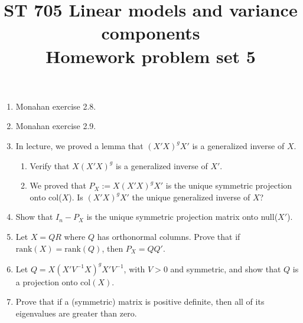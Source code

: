 \documentclass[11pt]{article}
\title{ST 705 Linear models and variance components \\ 
        Homework problem set 5}
\begin{document}
\maketitle

\begin{enumerate}

\item Monahan exercise 2.8.

\item Monahan exercise 2.9.

\item In lecture, we proved a lemma that $(X'X)^{g}X'$ is a generalized inverse of $X$.
\begin{enumerate}
\item Verify that $X(X'X)^{g}$ is a generalized inverse of $X'$.
\item We proved that $P_{X} := X(X'X)^{g}X'$ is the unique symmetric projection onto col($X$).  Is $(X'X)^{g}X'$ the unique generalized inverse of $X$?  
\end{enumerate}

\item Show that $I_{n} - P_{X}$ is the unique symmetric projection matrix onto null($X'$).

\item Let $X = QR$ where $Q$ has orthonormal columns.  Prove that if $\text{rank}(X) = \text{rank}(Q)$, then $P_{X} = QQ'$.

\item Let $Q = X(X'V^{-1}X)^{g}X'V^{-1}$, with $V > 0$ and symmetric, and show that $Q$ is a projection onto col$(X)$.

\item Prove that if a (symmetric) matrix is positive definite, then all of its eigenvalues are greater than zero.

\end{enumerate}
\end{document}
